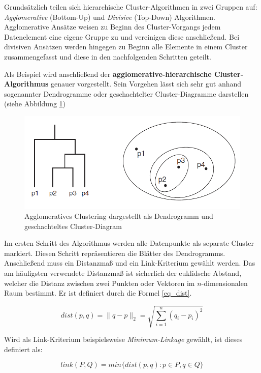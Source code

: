 Grundsätzlich teilen sich hierarchische Cluster-Algorithmen in zwei Gruppen auf:
\textit{Agglomerative} (Bottom-Up) und \textit{Divisive} (Top-Down) Algorithmen.
Agglomerative Ansätze weisen zu Beginn des Cluster-Vorgangs jedem Datenelement eine eigene Gruppe zu und vereinigen
diese anschließend.
Bei divisiven Ansätzen werden hingegen zu Beginn alle Elemente in einem Cluster zusammengefasst und
diese in den nachfolgenden Schritten geteilt.

Als Beispiel wird anschließend der \textbf{agglomerative-hierarchische Cluster-Algorithmus} genauer vorgestellt.
Sein Vorgehen lässt sich sehr gut anhand sogenannter Dendrogramme oder geschachtelter Cluster-Diagramme darstellen
(siehe Abbildung \ref{fig:grund_agglo_clustering})

\begin{figure}[H]
    \centering
    \includegraphics[width=0.7\linewidth]{../resources/img/grundlagen/agglo_clustering}
    \caption{Agglomeratives Clustering dargestellt als Dendrogramm und geschachteltes Cluster-Diagram}
    \label{fig:grund_agglo_clustering}
\end{figure}

Im ersten Schritt des Algorithmus werden alle Datenpunkte als separate Cluster markiert. Diesen Schritt
repräsentieren die Blätter des Dendrogramms.
Anschließend muss ein Distanzmaß und ein Link-Kriterium gewählt werden.
Das am häufigsten verwendete Distanzmaß ist sicherlich der euklidsche Abstand, welcher die Distanz zwischen zwei Punkten
oder Vektoren im $n$-dimensionalen Raum bestimmt. Er ist definiert durch die Formel \ref{eq_dist}.

\begin{equation}
\label{eq_dist}
    dist(p,q) = \|q-p\|_2 = \sqrt{\sum_{i=1}^n (q_i-p_i)^2}
\end{equation}

Wird als Link-Kriterium beispielsweise \textit{Minimum-Linkage} gewählt, ist dieses definiert als:

\begin{equation}
\label{eq_linkage}
    link(P, Q) = min\{ dist(p,q) : p \in P, q \in Q\}
\end{equation}

